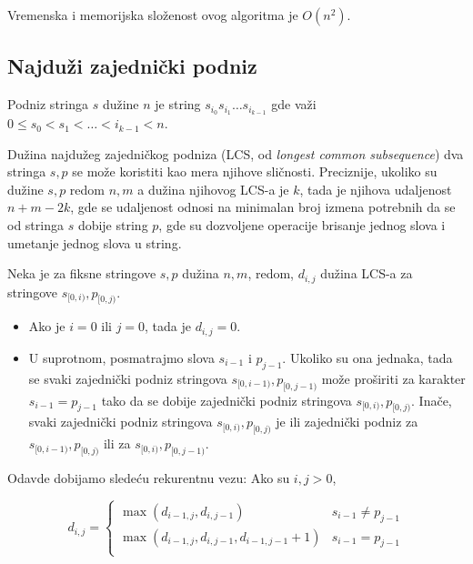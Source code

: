 \noindent
\begin{minipage}[l]{\textwidth}

\end{minipage}

Vremenska i memorijska slo\v zenost ovog algoritma je $O(n^2)$.

\subsection{Najdu\v zi zajedni\v cki podniz}

\begin{dfn}
Podniz stringa $s$ du\v zine $n$ je string $s_{i_0}s_{i_1}\ldots s_{i_{k-1}}$ gde va\v zi $0 \leq s_0 < s_1 < \ldots < i_{k-1} < n$.
\end{dfn}

Du\v zina najdu\v zeg zajedni\v ckog podniza (LCS, od \textit{longest common subsequence}) dva stringa $s,p$ se mo\v ze koristiti kao mera njihove sli\v cnosti. Preciznije, ukoliko su du\v zine $s,p$ redom $n,m$ a du\v zina njihovog LCS-a je $k$, tada je njihova udaljenost $n+m-2k$, gde se udaljenost odnosi na minimalan broj izmena potrebnih da se od stringa $s$ dobije string $p$, gde su dozvoljene operacije brisanje jednog slova i umetanje jednog slova u string.

Neka je za fiksne stringove $s,p$ du\v zina $n,m$, redom, $d_{i,j}$ du\v zina LCS-a za stringove $s_{[0, i)}, p_{[0, j)}$.

\begin{itemize}
\item Ako je $i=0$ ili $j=0$, tada je $d_{i,j} = 0$.
\item U suprotnom, posmatrajmo slova $s_{i-1}$ i $p_{j-1}$. Ukoliko su ona jednaka, tada se svaki zajedni\v cki podniz stringova $s_{[0, i-1)}, p_{[0, j-1)}$ mo\v ze pro\v siriti za karakter $s_{i-1} = p_{j-1}$ tako da se dobije zajedni\v cki podniz stringova $s_{[0, i)}, p_{[0, j)}$. Ina\v ce, svaki zajedni\v cki podniz stringova $s_{[0, i)}, p_{[0, j)}$ je ili zajedni\v cki podniz za $s_{[0, i-1)}, p_{[0, j)}$ ili za $s_{[0, i)}, p_{[0, j-1)}$.
\end{itemize}

Odavde dobijamo slede\' cu rekurentnu vezu: Ako su $i,j > 0$,

\begin{equation}
    d_{i,j} = \begin{cases}
        \max(d_{i-1,j}, d_{i,j-1}) & s_{i-1} \not = p_{j-1} \\
        \max(d_{i-1,j}, d_{i,j-1}, d_{i-1,j-1} + 1) &  s_{i-1} = p_{j-1} \\
    \end{cases}
\end{equation}

